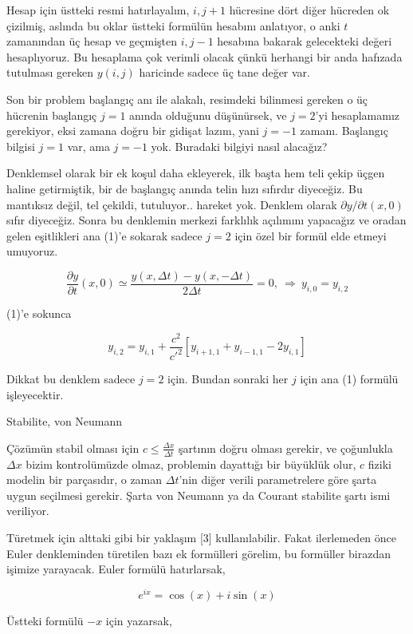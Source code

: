 \documentclass[12pt,fleqn]{article}\usepackage{../../common}
\begin{document}
Hesap için üstteki resmi hatırlayalım, $i,j+1$ hücresine dört diğer hücreden ok
çizilmiş, aslında bu oklar üstteki formülün hesabını anlatıyor, o anki $t$
zamanından üç hesap ve geçmişten $i,j-1$ hesabına bakarak gelecekteki değeri
hesaplıyoruz. Bu hesaplama çok verimli olacak çünkü herhangi bir anda hafızada
tutulması gereken $y(i,j)$ haricinde sadece üç tane değer var. 

Son bir problem başlangıç anı ile alakalı, resimdeki bilinmesi gereken o üç
hücrenin başlangıç $j=1$ anında olduğunu düşünürsek, ve $j=2$'yi hesaplamamız
gerekiyor, eksi zamana doğru bir gidişat lazım, yani $j=-1$ zamanı. Başlangıç
bilgisi $j=1$ var, ama $j=-1$ yok. Buradaki bilgiyi nasıl alacağız?

Denklemsel olarak bir ek koşul daha ekleyerek, ilk başta hem teli çekip üçgen
haline getirmiştik, bir de başlangıç anında telin hızı sıfırdır diyeceğiz. Bu
mantıksız değil, tel çekildi, tutuluyor.. hareket yok. Denklem olarak
$\partial y / \partial t(x,0)$ sıfır diyeceğiz. Sonra bu denklemin merkezi
farklılık açılımını yapacağız ve oradan gelen eşitlikleri ana (1)'e sokarak
sadece $j=2$ için özel bir formül elde etmeyi umuyoruz.

$$
\frac{\partial y}{\partial t}(x,0) \simeq
\frac{y(x, \Delta t)- y(x, -\Delta t)}{2\Delta t}=0, \
\Rightarrow \ y_{i, 0} = y_{i,2}
$$

(1)'e sokunca

$$
y_{i,2} = y_{i,1}+ \frac{c^2} {c'^2}
\left [ y_{i+1,1}+y_{i-1,1}-2 y_{i,1}\right]
$$

Dikkat bu denklem sadece $j=2$ için. Bundan sonraki her $j$ için ana (1) formülü
işleyecektir.

Stabilite, von Neumann

Çözümün stabil olması için $c \le \frac{\Delta x}{\Delta t}$ şartının doğru
olması gerekir, ve çoğunlukla $\Delta x$ bizim kontrolümüzde olmaz, problemin
dayattığı bir büyüklük olur, $c$ fiziki modelin bir parçasıdır, o zaman $\Delta t$'nin
diğer verili parametrelere göre şarta uygun seçilmesi gerekir. Şarta von
Neumann ya da Courant stabilite şartı ismi veriliyor.

Türetmek için alttaki gibi bir yaklaşım [3] kullanılabilir. Fakat ilerlemeden
önce Euler denkleminden türetilen bazı ek formülleri görelim, bu formüller
birazdan işimize yarayacak. Euler formülü hatırlarsak,

$$
e^{ix} = \cos (x) + i\sin(x)
$$

Üstteki formülü $-x$ için yazarsak,
\end{document}
